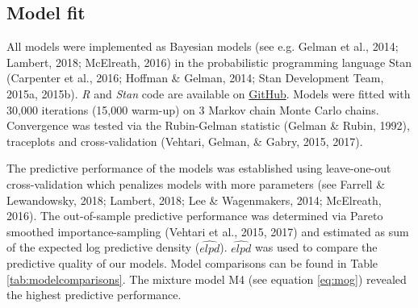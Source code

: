 \documentclass[english,jou,floatsintext]{apa7}
\begin{document}
\hypertarget{model-fit}{%
\subsection{Model fit}\label{model-fit}}

All models were implemented as Bayesian models (see e.g. Gelman et al., 2014; Lambert, 2018; McElreath, 2016) in the probabilistic programming language Stan (Carpenter et al., 2016; Hoffman \& Gelman, 2014; Stan Development Team, 2015a, 2015b). \textit{R} and \textit{Stan} code are available on \href{https://github.com/jensroes/Typing-disfluency}{GitHub}. Models were fitted with 30,000 iterations (15,000 warm-up) on 3 Markov chain Monte Carlo chains. Convergence was tested via the Rubin-Gelman statistic (Gelman \& Rubin, 1992), traceplots and cross-validation (Vehtari, Gelman, \& Gabry, 2015, 2017).

The predictive performance of the models was established using leave-one-out cross-validation which penalizes models with more parameters (see Farrell \& Lewandowsky, 2018; Lambert, 2018; Lee \& Wagenmakers, 2014; McElreath, 2016). The out-of-sample predictive performance was determined via Pareto smoothed importance-sampling (Vehtari et al., 2015, 2017) and estimated as sum of the expected log predictive density (\(\widehat{elpd}\)). \(\widehat{elpd}\) was used to compare the predictive quality of our models. Model comparisons can be found in Table \ref{tab:modelcomparisons}. The mixture model M4 (see equation \ref{eq:mog}) revealed the highest predictive performance.
\end{document}
